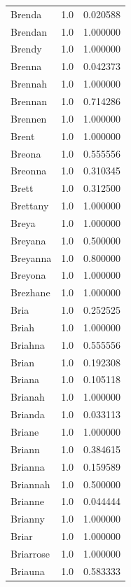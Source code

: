 \documentclass[
  letterpaper,
  DIV=11,
  numbers=noendperiod]{scrreprt}
\begin{document}
\begin{tabular}{lrr}
Brenda          &   1.0 &   0.020588 \\
Brendan         &   1.0 &   1.000000 \\
Brendy          &   1.0 &   1.000000 \\
Brenna          &   1.0 &   0.042373 \\
Brennah         &   1.0 &   1.000000 \\
Brennan         &   1.0 &   0.714286 \\
Brennen         &   1.0 &   1.000000 \\
Brent           &   1.0 &   1.000000 \\
Breona          &   1.0 &   0.555556 \\
Breonna         &   1.0 &   0.310345 \\
Brett           &   1.0 &   0.312500 \\
Brettany        &   1.0 &   1.000000 \\
Breya           &   1.0 &   1.000000 \\
Breyana         &   1.0 &   0.500000 \\
Breyanna        &   1.0 &   0.800000 \\
Breyona         &   1.0 &   1.000000 \\
Brezhane        &   1.0 &   1.000000 \\
Bria            &   1.0 &   0.252525 \\
Briah           &   1.0 &   1.000000 \\
Briahna         &   1.0 &   0.555556 \\
Brian           &   1.0 &   0.192308 \\
Briana          &   1.0 &   0.105118 \\
Brianah         &   1.0 &   1.000000 \\
Brianda         &   1.0 &   0.033113 \\
Briane          &   1.0 &   1.000000 \\
Briann          &   1.0 &   0.384615 \\
Brianna         &   1.0 &   0.159589 \\
Briannah        &   1.0 &   0.500000 \\
Brianne         &   1.0 &   0.044444 \\
Brianny         &   1.0 &   1.000000 \\
Briar           &   1.0 &   1.000000 \\
Briarrose       &   1.0 &   1.000000 \\
Briauna         &   1.0 &   0.583333 \\

\end{tabular}
\end{document}
